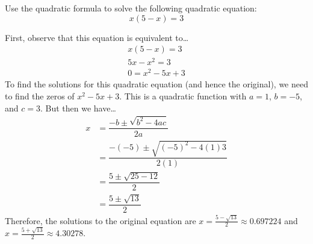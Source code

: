 \documentclass[11pt,letterpaper]{article}
\begin{document}
\newpage



 Use the quadratic formula to solve the following quadratic equation:
	\[
	x(5 - x)= 3
	\] \pspace

\sol First, observe that this equation is equivalent to\dots
	\[
	\begin{gathered}
	x(5 - x)= 3 \\[0.3cm]
	5x - x^2= 3 \\[0.3cm]
	0= x^2 - 5x + 3
	\end{gathered}
	\]
To find the solutions for this quadratic equation (and hence the original), we need to find the zeros of $x^2 - 5x + 3$. This is a quadratic function with $a= 1$, $b= -5$, and $c= 3$. But then we have\dots
	\[
	\begin{aligned}
	x&= \dfrac{-b \pm \sqrt{b^2 - 4ac}}{2a} \\[0.3cm]
	&= \dfrac{-(-5) \pm \sqrt{(-5)^2 - 4(1)3}}{2(1)} \\[0.3cm]
	&= \dfrac{5 \pm \sqrt{25 - 12}}{2} \\[0.3cm]
	&= \dfrac{5 \pm \sqrt{13}}{2}
	\end{aligned}
	\] \pspace 
Therefore, the solutions to the original equation are $x= \frac{5 - \sqrt{13}}{2} \approx 0.697224$ and $x= \frac{5 + \sqrt{13}}{2} \approx 4.30278$. 
\end{document}
